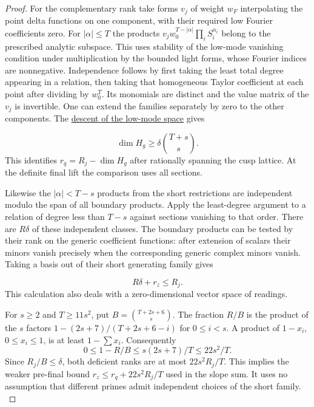 \begin{proof}
For the complementary rank take forms \(v_j\) of weight
\(w_F\) interpolating the point delta functions on one
component, with their required low Fourier coefficients
zero. For \(|\alpha|\le T\) the products
\(v_j w_0^{T-|\alpha|}\prod_i S_i^{\alpha_i}\)
belong to the prescribed analytic subspace. This uses
stability of the low-mode vanishing condition under
multiplication by the bounded light forms, whose Fourier
indices are nonnegative. Independence follows by first
taking the least total degree appearing in a relation,
then taking that homogeneous Taylor coefficient at each
point after dividing by \(w_0^T\). Its monomials are
distinct and the value matrix of the \(v_j\) is invertible.
One can extend the families separately by zero to the
other components. The \hyperref[par:shifted-good]{descent of the low-mode space} gives

\[
  \dim H_g\ge\delta\binom{T+s}{s}.
\]
 This identifies
\(r_q=R_j-\dim H_g\) after rationally spanning the cusp
lattice. At the definite final lift the comparison uses
all sections.

Likewise the \(|\alpha|<T-s\) products from the short
restrictions are independent modulo the span of all
boundary products. Apply the least-degree argument to
a relation of degree less than \(T-s\) against sections
vanishing to that order. There are \(R\delta\) of these
independent classes. The boundary products can be tested
by their rank on the generic coefficient functions: after
extension of scalars their minors vanish precisely when
the corresponding generic complex minors vanish. Taking
a basis out of their short generating family gives

\[
  R\delta+r_z\le R_j.
\]
 This calculation also deals with a
zero-dimensional vector space of readings.

For \(s\ge2\) and \(T\ge11s^2\), put \(B=\binom{T+2s+6}{s}\).
The fraction \(R/B\) is the product of the \(s\) factors
\(1-(2s+7)/(T+2s+6-i)\) for \(0\le i<s\).
A product of \(1-x_i\), \(0\le x_i\le1\), is at least
\(1-\sum x_i\). Consequently
\[
 0\le 1-R/B\le s(2s+7)/T\le22s^2/T .
\]
Since \(R_j/B\le\delta\), both deficient ranks are at most
\(22s^2R_j/T\). This implies the weaker pre-final bound
\(r_z\le r_q+22s^2R_j/T\) used in the slope sum. It uses
no assumption that different primes admit independent
choices of the short family. \label{cor:slice-shares-1}
\end{proof}
